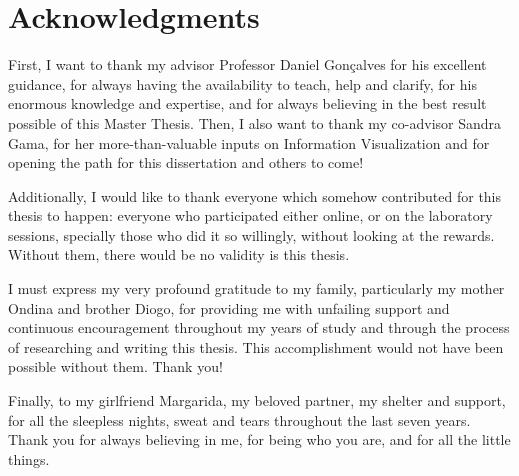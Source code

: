 
\chapter*{Acknowledgments}
%
First, I want to thank my advisor Professor Daniel Gonçalves for his excellent guidance, for always having the availability to teach, help and
clarify, for his enormous knowledge and expertise, and for always believing in the best result possible of this Master Thesis. Then, I also
want to thank my co-advisor Sandra Gama, for her more-than-valuable inputs on Information Visualization and for opening the path for this
dissertation and others to come! \\ \par
%
Additionally, I would like to thank everyone which somehow contributed for this thesis to happen: everyone who participated either online,
or on the laboratory sessions, specially those who did it so willingly, without looking at the rewards. Without them, there would be no
validity is this thesis.  \\ \par
%
I must express my very profound gratitude to my family, particularly my mother Ondina and brother Diogo, for providing me with unfailing support
and continuous encouragement throughout my years of study and through the process of researching and writing this thesis. This accomplishment
would not have been possible without them. Thank you! \\ \par
%
Finally, to my girlfriend Margarida, my beloved partner, my shelter and support, for all the sleepless nights, sweat and tears throughout
the last seven years. Thank you for always believing in me, for being who you are, and for all the little things. \\
